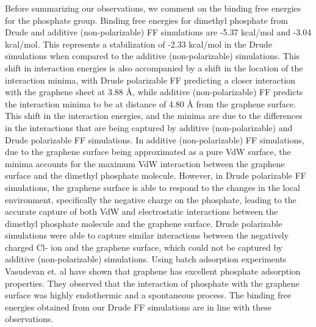 Before summarizing our observations, we comment on the binding free energies for the phosphate group. Binding free energies for dimethyl phosphate from Drude and additive (non-polarizable) FF simulations are -5.37 kcal/mol and -3.04 kcal/mol. This represents a stabilization of -2.33 kcal/mol in the Drude simulations when compared to the additive (non-polarizable) simulations. This shift in interaction energies is also accompanied by a shift in the location of the interaction minima, with Drude polarizable FF predicting a closer interaction with the graphene sheet at 3.88 Å, while additive (non-polarizable) FF predicts the interaction minima to be at distance of 4.80 Å from the graphene surface. This shift in the interaction energies, and the minima are due to the differences in the interactions that are being captured by additive (non-polarizable) and Drude polarizable FF simulations. In additive (non-polarizable) FF simulations, due to the graphene surface being approximated as a pure VdW surface, the minima accounts for the maximum VdW interaction between the graphene surface and the dimethyl phosphate molecule. However, in Drude polarizable FF simulations, the graphene surface is able to respond to the changes in the local environment, specifically the negative charge on the phosphate, leading to the accurate capture of both VdW and electrostatic interactions between the dimethyl phosphate molecule and the graphene surface. Drude polarizable simulations were able to capture similar interactions between the negatively charged Cl- ion and the graphene surface, which could not be captured by additive (non-polarizable) simulations.\supercite{h_capturing_2023} Using batch adsorption experiments Vasudevan et. al have shown that graphene has excellent phosphate adsorption properties.\supercite{vasudevan_adsorption_2012} They observed that the interaction of phosphate with the graphene surface was highly endothermic and a spontaneous process. The binding free energies obtained from our Drude FF simulations are in line with these observations.

